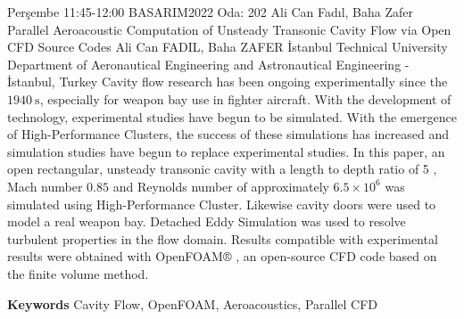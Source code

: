 
    \begin{abstract_basarim}
    {Perşembe 11:45-12:00}
    {BASARIM2022}
    {Oda: 202}
    {Ali Can Fadıl, Baha Zafer}
    {Parallel Aeroacoustic Computation of Unsteady Transonic Cavity Flow via Open CFD Source Codes}
    {%
    Ali Can FADIL, Baha ZAFER}
    {%
    }
    {%
    İstanbul Technical University Department of Aeronautical Engineering and Astronautical Engineering - İstanbul, Turkey}
    Cavity flow research has been ongoing experimentally since the $1940 \mathrm{~s}$, especially for weapon bay use in fighter aircraft. With the development of technology, experimental studies have begun to be simulated. With the emergence of High-Performance Clusters, the success of these simulations has increased and simulation studies have begun to replace experimental studies. In this paper, an open rectangular, unsteady transonic cavity with a length to depth ratio of 5 , Mach number $0.85$ and Reynolds number of approximately $6.5 \times 10^{6}$ was simulated using High-Performance Cluster. Likewise cavity doors were used to model a real weapon bay. Detached Eddy Simulation was used to resolve turbulent properties in the flow domain. Results compatible with experimental results were obtained with OpenFOAM® , an open-source CFD code based on the finite volume method. 
    
        \textbf{Keywords} \newline{}Cavity Flow, OpenFOAM, Aeroacoustics, Parallel CFD
    \end{abstract_basarim}
    